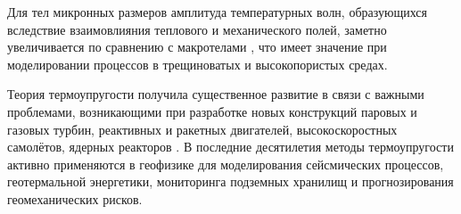Для тел микронных размеров амплитуда температурных волн, образующихся вследствие взаимовлияния теплового и механического полей, заметно увеличивается по сравнению с макротелами \cite{Permsc}, что имеет значение при моделировании процессов в трещиноватых и высокопористых средах.

Теория термоупругости получила существенное развитие в связи с важными проблемами, возникающими при разработке новых конструкций паровых и газовых турбин, реактивных и ракетных двигателей, высокоскоростных самолётов, ядерных реакторов \cite{Doklad}. В последние десятилетия методы термоупругости активно применяются в геофизике для моделирования сейсмических процессов, геотермальной энергетики, мониторинга подземных хранилищ и прогнозирования геомеханических рисков.